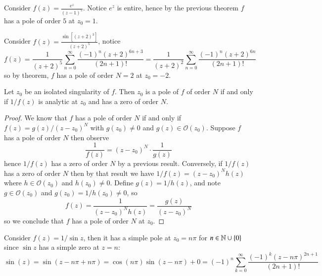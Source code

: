 \documentclass[12pt, a4paper, oneside, openright, titlepage]{book}
\begin{document}
\begin{eg}
    Consider $f(z) = \frac{e^z}{(z-1)^5}$. Notice $e^z$ is entire, hence by the previous theorem $f$ has a pole of order $5$ at $z_0 = 1$.
\end{eg}

\begin{eg}
    Consider $f(z) = \frac{\sin[(z+2)^3]}{(z+2)^5}$, notice \begin{equation*}
        f(z) = \frac{1}{(z+2)^5}\sum_{n=0}^{\infty}\frac{(-1)^n(z+2)^{6n+3}}{(2n+1)!} = \frac{1}{(z+2)^2}\sum_{n=0}^{\infty}\frac{(-1)^n(z+2)^{6n}}{(2n+1)!}
    \end{equation*}
    so by theorem, $f$ has a pole of order $N  =2$ at $z_0 = -2$.
\end{eg}

\begin{thm}
    Let $z_0$ be an isolated singularity of $f$. Then $z_0$ is a pole of $f$ of order $N$ if and only if $1/f(z)$ is analytic at $z_0$ and has a zero of order $N$.
\end{thm}
\begin{proof}
    We know that $f$ has a pole of order $N$ if and only if $f(z) = g(z)/(z-z_0)^N$ with $g(z_0) \neq 0$ and $g(z) \in \mathcal{O}(z_0)$. Suppose $f$ has a pole of order $N$ then observe \begin{equation*}
        \frac{1}{f(z)} = (z-z_0)^N\cdot\frac{1}{g(z)}
    \end{equation*}
    hence $1/f(z)$ has a zero of order $N$ by a previous result. Conversely, if $1/f(z)$ has a zero of order $N$ then by that result we have $1/f(z) = (z-z_0)^Nh(z)$ where $h \in \mathcal{O}(z_0)$ and $h(z_0) \neq 0$. Define $g(z) = 1/h(z)$, and note $g \in \mathcal{O}(z_0)$ and $g(z_0) = 1/h(z_0) \neq 0$, so \begin{equation*}
        f(z) = \frac{1}{(z-z_0)^Nh(z)} = \frac{g(z)}{(z-z_0)^N}
    \end{equation*}
    so we conclude that $f$ has a pole of order $N$ at $z_0$.
\end{proof}

\begin{eg}
    Consider $f(z) = 1/\sin z$, then it has a simple pole at $z_0 = n\pi$ for $n \in \mathbb N\cup \{0\}$ since $\sin z$ has a simple zero at $z = n$: \begin{equation*}
        \sin(z) = \sin(z-n\pi+n\pi) = \cos(n\pi)\sin(z-n\pi)+0=(-1)^n\sum_{k=0}^{\infty}\frac{(-1)^k(z-n\pi)^{2n+1}}{(2n+1)!}
    \end{equation*}
\end{eg}
\end{document}
